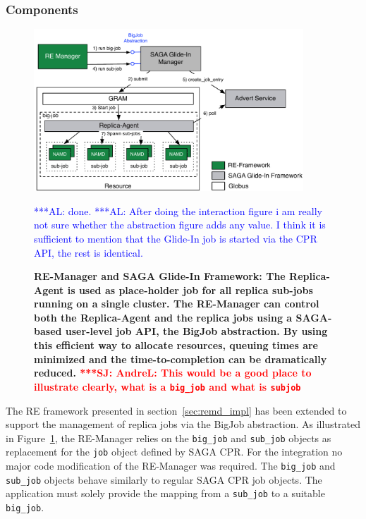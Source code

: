 \documentclass{rspublic}
\newcommand{\alnote}[1]{ {\textcolor{blue} { ***AL: #1 }}}
\newcommand{\jhanote}[1]{ {\textcolor{red} { ***SJ: #1 }}}
\newcommand{\alnote}[1]{}
\newcommand{\jhanote}[1]{}
\newcommand{\replicaagent}[1]{Replica-Agent }
\newcommand{\remanager}[1]{RE-Manager }
\begin{document}
\subsubsection{Components}     

\begin{figure}[t]
    \centering
    \includegraphics[width=0.9\textwidth]{re_bigjob_interactions}   
    
    \caption{\footnotesize \bf RE-Manager and SAGA Glide-In Framework:
      The Replica-Agent is used as place-holder job for all replica
      sub-jobs running on a single cluster. The \remanager\ can
      control both the \replicaagent\ and the replica jobs using a
      SAGA-based user-level job API, the BigJob abstraction. By using
      this efficient way to allocate resources, queuing times are
      minimized and the time-to-completion can be dramatically
      reduced. \jhanote{AndreL: This would be a good place to
        illustrate clearly, what is a \texttt{big\_job} and what is
        \texttt{sub\-job}}} \alnote{done.} \alnote{After doing the
      interaction figure i am really not sure whether the abstraction
      figure adds any value. I think it is sufficient to mention that
      the Glide-In job is started via the CPR API, the rest is
      identical.}
    \label{fig:remdmanager_v1.1}
\end{figure}
    
The RE framework presented in section~\ref{sec:remd_impl} has been 
extended to support the management of replica jobs via the BigJob abstraction. 
As illustrated in Figure~\ref{fig:remdmanager_v1.1}, the RE-Manager relies on
the \texttt{big\_job} and \texttt{sub\_job} objects as replacement for 
the \texttt{job} object defined by SAGA CPR. For the integration 
no major code modification of the RE-Manager was required. The \texttt{big\_job}
and \texttt{sub\_job} objects behave similarly to regular SAGA CPR job objects.
The application must solely provide the mapping from a \texttt{sub\_job} to 
a suitable \texttt{big\_job}.
\end{document}
